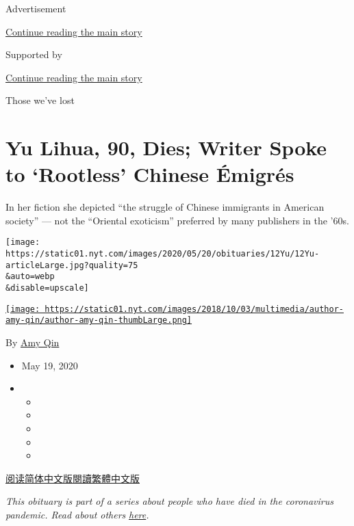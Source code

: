 Advertisement

\protect\hyperlink{after-top}{Continue reading the main story}

Supported by

\protect\hyperlink{after-sponsor}{Continue reading the main story}

Those we've lost

\hypertarget{yu-lihua-90-dies-writer-spoke-to-rootless-chinese-uxe9migruxe9s}{%
\section{Yu Lihua, 90, Dies; Writer Spoke to `Rootless' Chinese
Émigrés}\label{yu-lihua-90-dies-writer-spoke-to-rootless-chinese-uxe9migruxe9s}}

In her fiction she depicted ``the struggle of Chinese immigrants in
American society'' --- not the ``Oriental exoticism'' preferred by many
publishers in the '60s.

\texttt{[image: https://static01.nyt.com/images/2020/05/20/obituaries/12Yu/12Yu-articleLarge.jpg?quality=75\\\&auto=webp\\\&disable=upscale]}

\href{https://www.nytimes.com/by/amy-qin}{\texttt{[image: https://static01.nyt.com/images/2018/10/03/multimedia/author-amy-qin/author-amy-qin-thumbLarge.png]}}

By \href{https://www.nytimes.com/by/amy-qin}{Amy Qin}

\begin{itemize}
\item
  May 19, 2020
\item
  \begin{itemize}
  \item
  \item
  \item
  \item
  \item
  \end{itemize}
\end{itemize}

\href{https://cn.nytimes.com/obits/20200520/yu-lihua-90-dies-writer-spoke-to-rootless-chinese-emigres/}{阅读简体中文版}\href{https://cn.nytimes.com/obits/20200520/yu-lihua-90-dies-writer-spoke-to-rootless-chinese-emigres/zh-hant}{閱讀繁體中文版}

\emph{This obituary is part of a series about people who have died in
the coronavirus pandemic. Read about others}
\href{https://www.nytimes.com/series/people-who-have-died-of-the-coronavirus}{\emph{here}}\emph{.}

